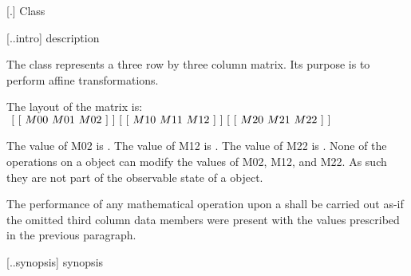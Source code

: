  [\iotwod.\matrixtwod] {Class }

 [\iotwod.\matrixtwod.intro] { description}

%
\pnum
The  class represents a three row by three column matrix. Its purpose is to perform affine transformations.

\pnum
The layout of the matrix is: \\
$
~[~[~M00~M01~M02~]~] \\
~[~[~M10~M11~M12~]~] \\
~[~[~M20~M21~M22~]~]$

\pnum
The value of M02 is . The value of M12 is . The value of M22 is . None of the operations on a  object can modify the values of M02, M12, and M22. As such they are not part of the observable state of a  object.

\pnum
The performance of any mathematical operation upon a  shall be carried out as-if the omitted third column data members were present with the values prescribed in the previous paragraph.

%
 [\iotwod.\matrixtwod.synopsis] { synopsis}

